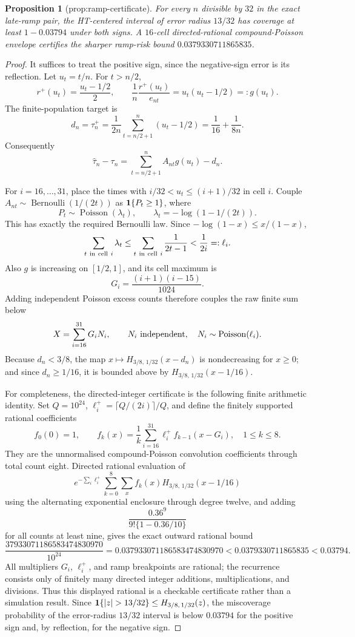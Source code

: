 \documentclass{article}
\newtheorem{proposition}{Proposition}
\begin{document}
\begin{proposition}[prop:ramp-certificate]\label{prop:ramp-certificate}
For every \(n\) divisible by \(32\) in the exact late-ramp pair, the HT-centered interval of error radius \(13/32\) has coverage at least \(1-0.03794\) under both signs. A \(16\)-cell directed-rational compound-Poisson envelope certifies the sharper ramp-risk bound \(0.0379330711865835\).
\end{proposition}
\begin{proof}
It suffices to treat the positive sign, since the negative-sign error is its reflection.  Let \(u_t=t/n\).  For \(t>n/2\),
\[
 r^+(u_t)=\frac{u_t-1/2}{2},\qquad
 \frac1n\frac{r^+(u_t)}{e_{nt}}=u_t(u_t-1/2)=:g(u_t).
\]
The finite-population target is
\[
 d_n=\tau_n^+
 =\frac1{2n}\sum_{t=n/2+1}^n(u_t-1/2)
 =\frac1{16}+\frac1{8n}.
\]
Consequently
\[
 \widehat\tau_n-\tau_n
 =\sum_{t=n/2+1}^n A_{nt}g(u_t)-d_n.
\]

For \(i=16,\ldots,31\), place the times with
\(i/32<u_t\leq(i+1)/32\) in cell \(i\).  Couple
\(A_{nt}\sim\operatorname{Bernoulli}(1/(2t))\) as
\({\bf1}\{P_t\geq1\}\), where
\[
 P_t\sim\operatorname{Poisson}(\lambda_t),\qquad
 \lambda_t=-\log(1-1/(2t)).
\]
This has exactly the required Bernoulli law.  Since
\(-\log(1-x)\leq x/(1-x)\),
\[
 \sum_{t\ {\rm in\ cell}\ i}\lambda_t
 \leq\sum_{t\ {\rm in\ cell}\ i}\frac1{2t-1}
 <\frac1{2i}=:\ell_i.
\]
Also \(g\) is increasing on \([1/2,1]\), and its cell maximum is
\[
 G_i=\frac{(i+1)(i-15)}{1024}.
\]
Adding independent Poisson excess counts therefore couples the raw finite sum below
\[
 X=\sum_{i=16}^{31}G_iN_i,\qquad
 N_i\ \hbox{independent},\quad N_i\sim\operatorname{Poisson}(\ell_i).
\]
Because \(d_n<3/8\), the map
\(x\mapsto H_{3/8,\,1/32}(x-d_n)\) is nondecreasing for \(x\geq0\);
and since \(d_n\geq1/16\), it is bounded above by
\(H_{3/8,\,1/32}(x-1/16)\).

For completeness, the directed-integer certificate is the following finite arithmetic identity.  Set \(Q=10^{24}\),
\(\ell_i^+=\lceil Q/(2i)\rceil/Q\), and define the finitely supported rational coefficients
\[
 f_0(0)=1,\qquad
 f_k(x)=\frac1k\sum_{i=16}^{31}\ell_i^+f_{k-1}(x-G_i),
 \quad 1\leq k\leq8.
\]
They are the unnormalised compound-Poisson convolution coefficients through total count eight.  Directed rational evaluation of
\[
 e^{-\sum_i\ell_i^+}
 \sum_{k=0}^8\sum_x f_k(x)
 H_{3/8,\,1/32}(x-1/16)
\]
using the alternating exponential enclosure through degree twelve, and adding
\[
 \frac{0.36^9}{9!\{1-0.36/10\}}
\]
for all counts at least nine, gives the exact outward rational bound
\[
 \frac{37933071186583474830970}{10^{24}}
 =0.037933071186583474830970
 <0.0379330711865835<0.03794.
\]
All multipliers \(G_i\), \(\ell_i^+\), and ramp breakpoints are rational; the recurrence consists only of finitely many directed integer additions, multiplications, and divisions.  Thus this displayed rational is a checkable certificate rather than a simulation result.  Since
\({\bf1}\{|z|>13/32\}\leq H_{3/8,\,1/32}(z)\), the miscoverage probability of the error-radius \(13/32\) interval is below \(0.03794\) for the positive sign and, by reflection, for the negative sign.
\end{proof}
\end{document}
